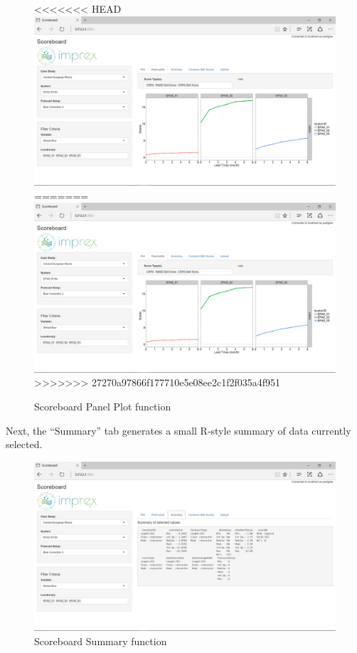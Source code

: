 \documentclass[logos,parttoc,morelanguage=french,morelanguage=german,draft]{orsay-memoire}
\begin{document}
\begin{figure}[hb]
\centering
<<<<<<< HEAD
\includegraphics[width=0.80\linewidth]{images/isb2.png}
=======
\includegraphics[width=0.85\linewidth]{images/isb2.png}
>>>>>>> 27270a97866f177710e5e08ee2c1f2f035a4f951
  \caption{Scoreboard Panel Plot function}
  \label{fig:isb2}
\end{figure}

Next, the ``Summary'' tab generates a small R-style summary of data currently selected. 

\begin{figure}[hb]
\centering
\includegraphics[width=0.80\linewidth]{images/isb3.png}
  \caption{Scoreboard Summary function}
  \label{fig:isb3}
\end{figure}
\end{document}
